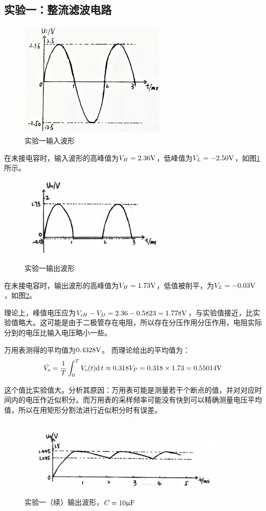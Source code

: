 \documentclass[a4paper,11pt,UTF8]{ctexart}
\begin{document}
\subsection{实验一：整流滤波电路}
\begin{figure}[H]
 \centering
 \includegraphics[width=7cm]{Exp1i}
 \caption{实验一输入波形}
 \label{fig:Exp1i}
\end{figure}
在未接电容时，输入波形的高峰值为$V_H=2.36\mathrm{V}$，低峰值为$V_L=-2.50\mathrm{V}$，如图\ref{fig:Exp1i}所示。
\begin{figure}[H]
 \centering
 \includegraphics[width=7cm]{Exp1o}
 \caption{实验一输出波形}
 \label{fig:Exp1o}
\end{figure}
在未接电容时，输出波形的高峰值为$V_H=1.73\mathrm{V}$，低值被削平，为$V_L=-0.03\mathrm{V}$，如图\ref{fig:Exp1o}。
\par 理论上，峰值电压应为$V_{iH}-V_D=2.36-0.5823=1.778\mathrm{V}$，与实验值接近，比实验值略大。这可能是由于二极管存在电阻，所以存在分压作用分压作用，电阻实际分到的电压比输入电压略小一些。
\par 万用表测得的平均值为$0.4328\mathrm{V}$。
而理论给出的平均值为：
\[ \bar{V_o}=\frac{1}{T}\int_0^TV_o(t)\mathrm{d\,}{t}\approx0.318V_P=0.318\times1.73=0.55014\mathrm{V} \]
\par 这个值比实验值大。分析其原因：万用表可能是测量若干个断点的值，并对对应时间内的电压作近似积分。而万用表的采样频率可能没有快到可以精确测量电压平均值，所以在用矩形分割法进行近似积分时有误差。
\begin{figure}[H]
 \centering
 \includegraphics[width=10cm]{Exp1Cono1}
 \caption{实验一（续）输出波形，$C=10\mathrm{\upmu F}$}
 \label{fig:Exp1Cono1}
\end{figure}
\end{document}

